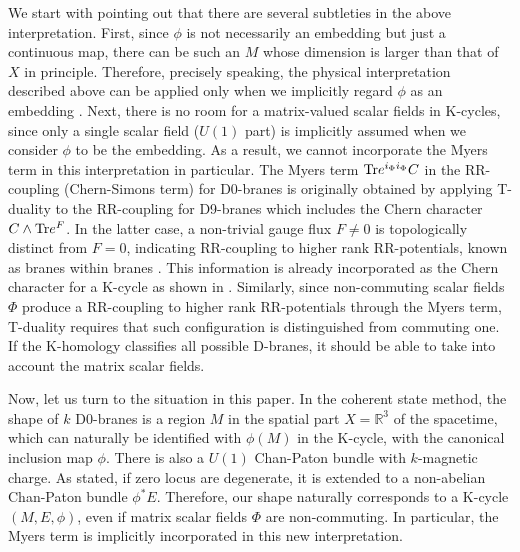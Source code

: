 \documentclass[12pt]{article}
\numberwithin{equation}{section}
\def\real{\mathbb{R}}
\begin{document}
We start with pointing out that there are several subtleties in
the above interpretation. 
First, since $\phi$ is not necessarily an embedding but just a continuous map,
there can be such an $M$ whose dimension is larger than that of $X$ in principle.
Therefore, precisely speaking, the physical interpretation described above 
can be applied only when we implicitly regard $\phi$ as an embedding {\cite{Baum2009}}.  
Next, %
there is no room for a matrix-valued scalar fields in K-cycles, 
since only a single scalar field ($U(1)$ part) is implicitly assumed 
when we consider $\phi$ to be the embedding. 
As a result, we cannot incorporate the Myers term in this interpretation in particular. 
The Myers term ${\rm Tr} e^{i_\Phi i_\Phi}C$ in the RR-coupling 
(Chern-Simons term) for D0-branes is originally obtained by applying T-duality
to the RR-coupling for D9-branes which includes the Chern character 
$C\wedge {\rm Tr} e^{F}$.
In the latter case, a non-trivial gauge flux $F\ne0$ is topologically distinct from $F=0$,  
indicating RR-coupling to higher rank RR-potentials, known as branes within branes \cite{Douglas:1995bn}.
This information is already incorporated as the Chern character for a 
K-cycle \cite{Douglas1982} as shown in \cite{Asakawa2002}.
Similarly, since non-commuting scalar fields $\Phi$ produce a RR-coupling 
to higher rank RR-potentials through the Myers term, 
T-duality requires that such configuration is distinguished from commuting one.
If the K-homology classifies all possible D-branes, 
it should be able to take into account the matrix scalar fields.

Now, let us turn to the situation in this paper.
In the coherent state method, 
the shape of $k$ D0-branes is a region $M$ in the spatial part $X=\real^3$ 
of the spacetime, which can naturally be identified with $\phi(M)$ in the K-cycle, 
with the canonical inclusion map $\phi$.
There is also a $U(1)$ Chan-Paton bundle with $k$-magnetic charge.
As stated, if zero locus are degenerate, 
it is extended to a non-abelian Chan-Paton bundle $\phi^* E$.
Therefore, our shape naturally corresponds to a K-cycle $(M,E,\phi)$, 
even if matrix scalar fields $\Phi$ are non-commuting.
In particular, the Myers term is implicitly incorporated in this new interpretation.
\end{document}
